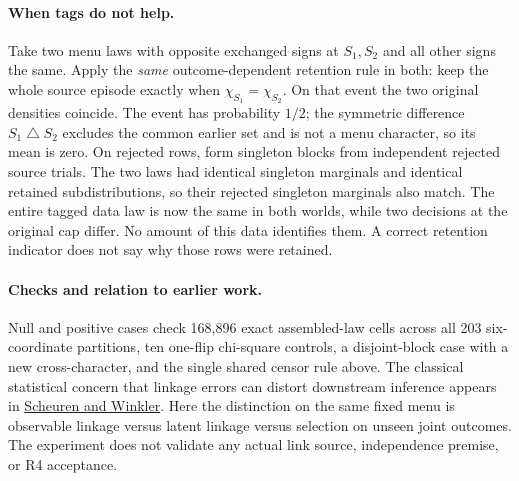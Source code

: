 \documentclass{article}
\begin{document}
\paragraph{When tags do not help.}
Take two menu laws with opposite exchanged signs at \(S_1,S_2\)
and all other signs the same. Apply the \emph{same} outcome-dependent
retention rule in both: keep the whole source episode exactly
when \(\chi_{S_1}=\chi_{S_2}\). On that event the two original
densities coincide. The event has probability \(1/2\);
the symmetric difference \(S_1\mathbin{\triangle}S_2\) excludes
the common earlier set and is not a menu character, so its
mean is zero. On rejected rows, form singleton blocks from
independent rejected source trials. The two laws had identical
singleton marginals and identical retained subdistributions,
so their rejected singleton marginals also match.
The entire tagged data law is now the same in both worlds,
while two decisions at the original cap differ. No amount of
this data identifies them. A correct retention indicator
does not say why those rows were retained.

\paragraph{Checks and relation to earlier work.}
Null and positive cases check 168,896 exact assembled-law
cells across all 203 six-coordinate partitions, ten one-flip
chi-square controls, a disjoint-block case with a new
cross-character, and the single shared censor rule above.
The classical statistical concern that linkage errors can
distort downstream inference appears in
\href{https://www150.statcan.gc.ca/n1/en/catalogue/12-001-X199300114476}{Scheuren
and Winkler}. Here the distinction on the same fixed menu is
observable linkage versus latent linkage versus selection on
unseen joint outcomes. The experiment does not validate any
actual link source, independence premise, or R4 acceptance.
\end{document}
